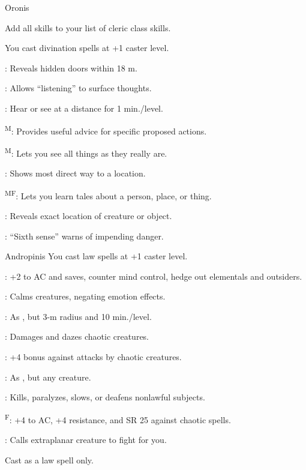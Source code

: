 {Oronis}
{Add all  skills to your list of cleric class skills.

You cast divination spells at +1 caster level.}
{
	\item {}: Reveals hidden doors within 18 m.
	\item {}: Allows ``listening'' to surface thoughts.
	\item {}: Hear or see at a distance for 1 min./level.
	\item {}\textsuperscript{M}: Provides useful advice for specific proposed actions.
	\item {}\textsuperscript{M}: Lets you see all things as they really are.
	\item {}: Shows most direct way to a location.
	\item {}\textsuperscript{MF}: Lets you learn tales about a person, place, or thing.
	\item {}: Reveals exact location of creature or object.
	\item {}: ``Sixth sense'' warns of impending danger.
}

{Andropinis}
{You cast law spells at +1 caster level.}
{
	\item {}: +2 to AC and saves, counter mind control, hedge out elementals and outsiders.
	\item {}: Calms creatures, negating emotion effects.
	\item {}: As , but 3-m radius and 10 min./level.
	\item {}: Damages and dazes chaotic creatures.
	\item {}: +4 bonus against attacks by chaotic creatures.
	\item {}: As , but any creature.
	\item {}: Kills, paralyzes, slows, or deafens nonlawful subjects.
	\item {}\textsuperscript{F}: +4 to AC, +4 resistance, and SR 25 against chaotic spells.
	\item {}\footnotemark[1]: Calls extraplanar creature to fight for you.
}
 Cast as a law spell only.

